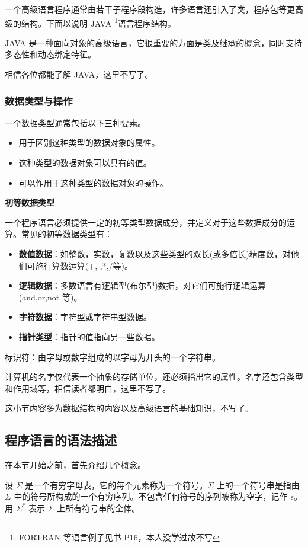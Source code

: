 一个高级语言程序通常由若干子程序段构造，许多语言还引入了类，程序包等更高级的结构。下面以说明 JAVA \footnote{FORTRAN 等语言例子见书 P16，本人没学过故不写}语言程序结构。

JAVA 是一种面向对象的高级语言，它很重要的方面是类及继承的概念，同时支持多态性和动态绑定特征。

相信各位都能了解 JAVA，这里不写了。

\subsubsection{数据类型与操作}

一个数据类型通常包括以下三种要素。
\begin{itemize}
	\item 用于区别这种类型的数据对象的属性。
	\item 这种类型的数据对象可以具有的值。
	\item 可以作用于这种类型的数据对象的操作。
\end{itemize}

\noindent\textbf{初等数据类型}

一个程序语言必须提供一定的初等类型数据成分，并定义对于这些数据成分的运算。常见的初等数据类型有：
\begin{itemize}
	\item \textbf{数值数据}：如整数，实数，复数以及这些类型的双长(或多倍长)精度数，对他们可施行算数运算(+,-,*,/等)。
	\item \textbf{逻辑数据}：多数语言有逻辑型(布尔型)数据，对它们可施行逻辑运算(and,or,not 等)。
	\item \textbf{字符数据}：字符型或字符串型数据。
	\item \textbf{指针类型}：指针的值指向另一些数据。
\end{itemize}

标识符：由字母或数字组成的以字母为开头的一个字符串。

计算机的名字仅代表一个抽象的存储单位，还必须指出它的属性。名字还包含类型和作用域等，相信读者都明白，这里不写了。

这小节内容多为数据结构的内容以及高级语言的基础知识，不写了。

\subsection{程序语言的语法描述}

在本节开始之前，首先介绍几个概念。

设 $\Sigma$ 是一个有穷字母表，它的每个元素称为一个符号。$\Sigma$ 上的一个符号串是指由 $\Sigma$ 中的符号所构成的一个有穷序列。不包含任何符号的序列被称为空字，记作 $\epsilon$。用 $\Sigma^*$ 表示 $\Sigma$ 上所有符号串的全体。

